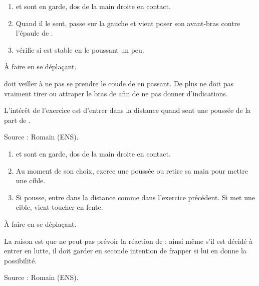 \begin{exercice}

\begin{enumerate}
	\item \A et \D sont en garde, dos de la main droite en contact.
	
	\item Quand il le sent, \A passe sur la gauche et vient poser son avant-bras contre l'épaule de \D.
	
	\item \D vérifie si \A est stable en le poussant un peu.
\end{enumerate}

À faire en se déplaçant.

\A doit veiller à ne pas se prendre le coude de \D en passant.
De plus \A ne doit pas vraiment tirer ou attraper le bras de \D afin de ne pas donner d'indications.

L'intérêt de l'exercice est d'entrer dans la distance quand \A sent une poussée de la part de \D.

Source : Romain (ENS).

\end{exercice}


\begin{exercice}

\begin{enumerate}
	\item \A et \D sont en garde, dos de la main droite en contact.
	
	\item Au moment de son choix, \D exerce une poussée ou retire sa main pour mettre une cible.
	
	\item Si \D pousse, \A entre dans la distance comme dans l'exercice précédent. Si \D met une cible, \A vient toucher en fente.
\end{enumerate}

À faire en se déplaçant.

La raison est que \A ne peut pas prévoir la réaction de \D : ainsi même s'il est décidé à entrer en lutte, il doit garder en seconde intention de frapper si \D lui en donne la possibilité.

Source : Romain (ENS).

\end{exercice}


